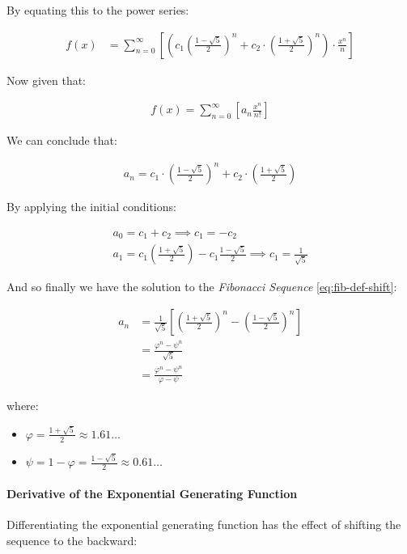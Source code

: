 \documentclass[11pt]{article}
\begin{document}
By equating this to the power series:


\begin{align*}
f\left( x \right)&= \sum^{\infty}_{n= 0}   \left[ \left( c_1\left( \frac{1- \sqrt{5} }{2} \right)^n +  c_2 \cdot  \left( \frac{1+ \sqrt{5} }{2} \right)^n \right) \cdot  \frac{x^n}{n} \right]
\end{align*}


Now given that:


\begin{align*}
f\left( x \right)= \sum^{\infty}_{n= 0}   \left[ a_n \frac{x^n}{n!} \right]
\end{align*}


We can conclude that:


\begin{align*}
a_n = c_1\cdot  \left( \frac{1- \sqrt{5} }{2} \right)^n +  c_2 \cdot  \left( \frac{1+  \sqrt{5} }{2} \right)
\end{align*}


By applying the initial conditions:


\begin{align*}
a_0= c_1 +  c_2  \implies  c_1= - c_2\\
a_1= c_1 \left( \frac{1+ \sqrt{5} }{2} \right) -  c_1 \frac{1-\sqrt{5} }{2}  \implies  c_1 = \frac{1}{\sqrt{5} }
\end{align*}


And so finally we have the solution to the \emph{Fibonacci Sequence} \ref{eq:fib-def-shift}:


\begin{align}
    a_n &= \frac{1}{\sqrt{5} } \left[ \left( \frac{1+  \sqrt{5} }{2}  \right)^n -  \left( \frac{1- \sqrt{5} }{2} \right)^n \right] \nonumber \\
&= \frac{\varphi^n - \psi^n}{\sqrt{5} } \nonumber\\
&=\frac{\varphi^n -  \psi^n}{\varphi - \psi} \label{eq:fib-sol}
\end{align}


where:

\begin{itemize}
\item \(\varphi = \frac{1+ \sqrt{5} }{2} \approx 1.61\ldots\)
\item \(\psi = 1-\varphi = \frac{1- \sqrt{5} }{2} \approx 0.61\ldots\)
\end{itemize}

\paragraph{Derivative of the Exponential Generating Function}
\label{Derivative-exp-gen-function}
Differentiating the exponential generating function has the effect of shifting the sequence to the backward: \cite{lehmanReadingsMathematicsComputer2010}
\end{document}
